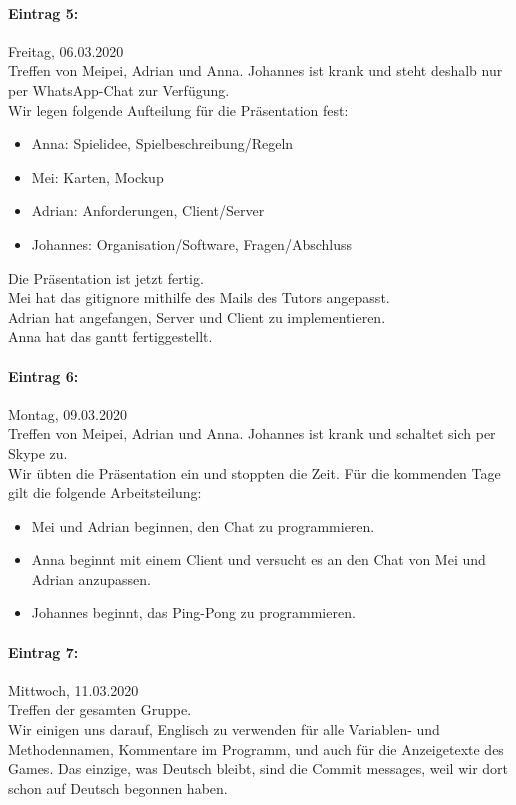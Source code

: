\documentclass[12pt]{article}
\begin{document}
\paragraph{Eintrag 5:}
Freitag, 06.03.2020\\
Treffen von Meipei, Adrian und Anna. Johannes ist krank und steht deshalb nur per WhatsApp-Chat zur Verf\"ugung.\\
Wir legen folgende Aufteilung für die Pr\"asentation fest:
\begin{itemize}
\item Anna: Spielidee, Spielbeschreibung/Regeln
\item Mei: Karten, Mockup
\item Adrian: Anforderungen, Client/Server
\item Johannes: Organisation/Software, Fragen/Abschluss
\end{itemize}

\noindent Die Pr\"asentation  ist jetzt fertig.\\
Mei hat das gitignore mithilfe des Mails des Tutors angepasst.\\
Adrian hat angefangen, Server und Client zu implementieren.\\ 
Anna hat das gantt fertiggestellt.

\paragraph{Eintrag 6:}
Montag, 09.03.2020\\
Treffen von Meipei, Adrian und Anna. Johannes ist krank und schaltet sich per Skype zu.\\
Wir übten die Pr\"asentation ein und stoppten die Zeit. Für die kommenden Tage gilt die folgende Arbeitsteilung:
\begin{itemize} 
\item Mei und Adrian beginnen, den Chat zu programmieren.
\item Anna beginnt mit einem Client und versucht es an den Chat von Mei und Adrian anzupassen.
\item Johannes beginnt, das Ping-Pong zu programmieren.
\end{itemize}

\paragraph{Eintrag 7:}
Mittwoch, 11.03.2020\\
Treffen der gesamten Gruppe.\\
Wir einigen uns darauf, Englisch zu verwenden f\"ur alle Variablen- und Methodennamen, Kommentare im Programm, und auch f\"ur die Anzeigetexte des Games. Das einzige, was Deutsch bleibt, sind die Commit messages, weil wir dort schon auf Deutsch begonnen haben.\\
\end{document}
